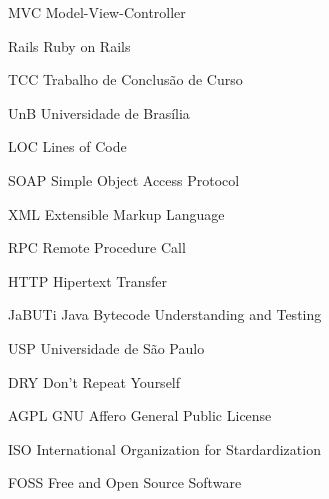 \begin{siglas}
  \item[MVC] Model-View-Controller
  \item[Rails] Ruby on Rails
  \item[TCC] Trabalho de Conclusão de Curso
  \item[UnB] Universidade de Brasília
  \item[LOC] Lines of Code
  \item[SOAP] Simple Object Access Protocol
  \item[XML] Extensible Markup Language
  \item[RPC] Remote Procedure Call
  \item[HTTP] Hipertext Transfer
  \item[JaBUTi] Java Bytecode Understanding and Testing
  \item[USP] Universidade de São Paulo
  \item[DRY] Don't Repeat Yourself
  \item[AGPL] GNU Affero General Public License
  \item[ISO] International Organization for Stardardization
  \item[FOSS] Free and Open Source Software
  
\end{siglas}
